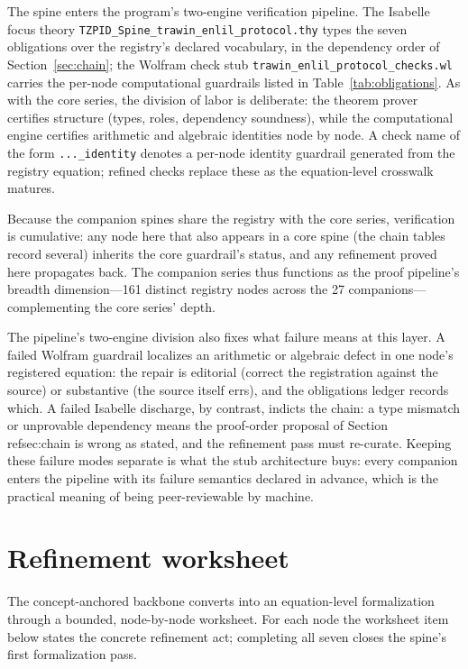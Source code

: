 \documentclass[11pt]{article}
\theoremstyle{remark}
\begin{document}
The spine enters the program's two-engine verification pipeline. The Isabelle focus theory \texttt{TZPID\_Spine\_trawin\_enlil\_protocol.thy} types the seven obligations over the registry's declared vocabulary, in the dependency order of Section~\ref{sec:chain}; the Wolfram check stub \texttt{trawin\_enlil\_protocol\_checks.wl} carries the per-node computational guardrails listed in Table~\ref{tab:obligations}. As with the core series, the division of labor is deliberate: the theorem prover certifies structure (types, roles, dependency soundness), while the computational engine certifies arithmetic and algebraic identities node by node. A check name of the form \texttt{...\_identity} denotes a per-node identity guardrail generated from the registry equation; refined checks replace these as the equation-level crosswalk matures.

Because the companion spines share the registry with the core series, verification is cumulative: any node here that also appears in a core spine (the chain tables record several) inherits the core guardrail's status, and any refinement proved here propagates back. The companion series thus functions as the proof pipeline's breadth dimension---161 distinct registry nodes across the 27 companions---complementing the core series' depth.

The pipeline's two-engine division also fixes what failure means at this layer. A failed Wolfram guardrail localizes an arithmetic or algebraic defect in one node's registered equation: the repair is editorial (correct the registration against the source) or substantive (the source itself errs), and the obligations ledger records which. A failed Isabelle discharge, by contrast, indicts the chain: a type mismatch or unprovable dependency means the proof-order proposal of Section~\\ref{sec:chain} is wrong as stated, and the refinement pass must re-curate. Keeping these failure modes separate is what the stub architecture buys: every companion enters the pipeline with its failure semantics declared in advance, which is the practical meaning of being peer-reviewable by machine.

\section{Refinement worksheet}
\label{sec:worksheet}

The concept-anchored backbone converts into an equation-level formalization through a bounded, node-by-node worksheet. For each node the worksheet item below states the concrete refinement act; completing all seven closes the spine's first formalization pass.
\end{document}
